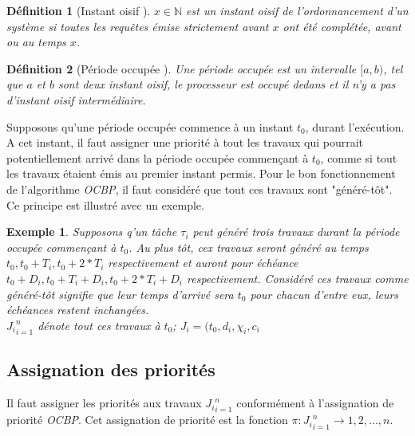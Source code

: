 \documentclass[12pt,a4paper,oneside]{book}
\theoremstyle{break}
\newtheorem{defin}{Définition}[chapter]
\newtheorem{exem}{Exemple}[chapter]
\theoremstyle{breakplain}
\begin{document}
\begin{defin}[Instant oisif \cite{goossens1999scheduling}]
$x \in \mathbb{N}$ est un instant oisif de l'ordonnancement d'un système si toutes les requêtes émise strictement avant $x$ ont été complétée, avant ou au temps $x$.
\end{defin}

\begin{defin}[Période occupée \cite{goossens1999scheduling}]
Une période occupée est un intervalle $[a, b)$, tel que $a$ et $b$ sont deux instant oisif, le processeur est occupé dedans et il n'y a pas d'instant oisif intermédiaire. 
\end{defin}

Supposons qu'une période occupée commence à un instant $t_0$, durant l'exécution. A cet instant, il faut assigner une priorité à tout les travaux qui pourrait potentiellement arrivé dans la période occupée commençant à $t_0$, comme si tout les travaux étaient émis au premier instant permis. Pour le bon fonctionnement de l'algorithme \textit{OCBP}, il faut considéré que tout ces travaux sont "généré-tôt". Ce principe est illustré avec un exemple.

\begin{exem}
Supposons q'un tâche $\tau_i$ peut généré trois travaux durant la période occupée commençant à $t_0$. Au plus tôt, cex travaux seront généré au temps $t_0, t_0+T_i, t_0+2*T_i$ respectivement et auront pour échéance $t_0+D_i, t_0+T_i+D_i, t_0+2*T_i+D_i$ respectivement. Considéré ces travaux comme généré-tôt signifie que leur temps d'arrivé sera $t_0$ pour chacun d'entre eux, leurs échéances restent inchangées.\\

${J_i}^n_{i=1}$ dénote tout ces travaux à $t_0$; $J_i = (t_0, d_i, \chi_i, c_i$
\end{exem}


\subsection{Assignation des priorités}

Il faut assigner les priorités aux travaux ${J_i}^n_{i=1}$ conformément à l'assignation de priorité \textit{OCBP}. Cet assignation de priorité est la fonction $\pi : {J_i}^n_{i=1} \rightarrow {1,2,...,n}$.\\
\end{document}
